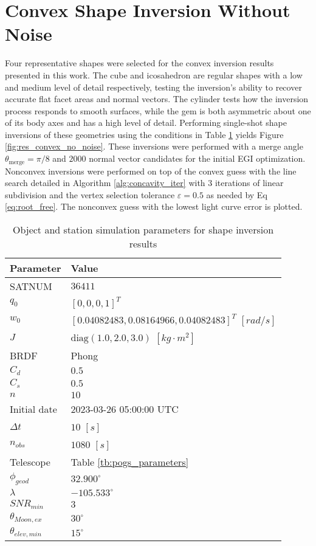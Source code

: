 \clearpage
\section{Convex Shape Inversion Without Noise}

Four representative shapes were selected for the convex inversion results presented in this work. The cube and icosahedron are regular shapes with a low and medium level of detail respectively, testing the inversion's ability to recover accurate flat facet areas and normal vectors. The cylinder tests how the inversion process responds to smooth surfaces, while the gem is both asymmetric about one of its body axes and has a high level of detail. Performing single-shot shape inversions of these geometries using the conditions in Table \ref{tb:cvx_props} yields Figure \ref{fig:res_convex_no_noise}. These inversions were performed with a merge angle $\theta_\mathrm{merge} = \pi / 8$ and $2000$ normal vector candidates for the initial EGI optimization. Nonconvex inversions were performed on top of the convex guess with the line search detailed in Algorithm \ref{alg:concavity_iter} with $3$ iterations of linear subdivision and the vertex selection tolerance $\varepsilon = 0.5$ as needed by Eq \ref{eq:root_free}. The nonconvex guess with the lowest light curve error is plotted.

\begin{table}[]
  \centering
  \begin{tabular}{|l|l|}
  \hline
  \textbf{Parameter} & \textbf{Value} \\ \hline
  SATNUM & $36411$ \\ \hline
  $q_0$ & $\left[ 0, 0, 0, 1 \right]^T$ \\ \hline
  $w_0$ & $\left[ 0.04082483, 0.08164966, 0.04082483 \right]^T$ $[rad/s]$ \\ \hline
  $J$ & $\mathrm{diag}\left( 1.0, 2.0, 3.0 \right)$ $\left[ kg \cdot m^2 \right]$ \\ \hline
  BRDF & Phong \\ \hline
  $C_d$ & $0.5$ \\ \hline
  $C_s$ & $0.5$ \\ \hline
  $n$ & $10$ \\ \hline
  Initial date & 2023-03-26 05:00:00 UTC \\ \hline
  $\Delta t$ & $10$ $[s]$ \\ \hline
  $n_{obs}$ & $1080$ $[s]$ \\ \hline
  Telescope & Table \ref{tb:pogs_parameters} \\ \hline
  $\phi_{geod}$ & $32.900^\circ$ \\ \hline
  $\lambda$ & $-105.533^\circ$ \\ \hline
  $SNR_{min}$ & $3$ \\ \hline
  $\theta_{Moon,ex}$ & $30^\circ$ \\ \hline
  $\theta_{elev,min}$ & $15^\circ$ \\ \hline
  \end{tabular}
  \caption{Object and station simulation parameters for shape inversion results}
  \label{tb:cvx_props}
\end{table}

